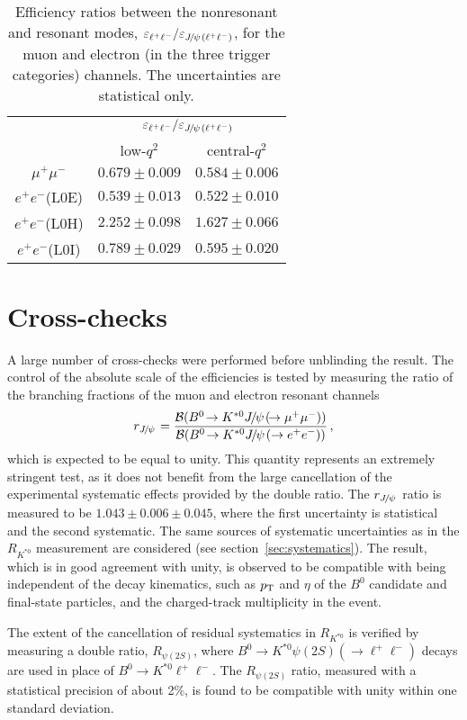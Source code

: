 \documentclass[12pt,a4paper]{article}
\def\mpmm       {\ensuremath{\Pmu^+ \Pmu^-}\xspace}
\def\RKst    {\mbox{R_{\Kstarz}}}
\def\Pmu         {\ensuremath{\upmu}\xspace}
\def\Ppsi        {\ensuremath{\uppsi}\xspace}
\def\PB      {\ensuremath{\mathrm{B}}\xspace}
\def\PJ      {\ensuremath{\mathrm{J}}\xspace}
\def\PK      {\ensuremath{\mathrm{K}}\xspace}
\def\Pe      {\ensuremath{\mathrm{e}}\xspace}
\def\Pmu         {\ensuremath{\mu}\xspace}
\def\Ppsi        {\ensuremath{\psi}\xspace}
\def\PB      {\ensuremath{B}\xspace}
\def\PJ      {\ensuremath{J}\xspace}
\def\PK      {\ensuremath{K}\xspace}
\def\Pe      {\ensuremath{e}\xspace}
\def\epem       {\ensuremath{\Pe^+\Pe^-}\xspace}
\def\ellm       {\ensuremath{\ell^-}\xspace}
\def\ellp       {\ensuremath{\ell^+}\xspace}
\def\kaon  {\ensuremath{\PK}\xspace}
\def\Kstarz  {\ensuremath{\kaon^{*0}}\xspace}
\def\B       {\ensuremath{\PB}\xspace}
\def\Bz      {\ensuremath{\B^0}\xspace}
\def\Bd      {\ensuremath{\B^0}\xspace}
\def\jpsi     {\ensuremath{{\PJ\mskip -3mu/\mskip -2mu\Ppsi\mskip 2mu}}\xspace}
\def\psitwos  {\ensuremath{\Ppsi{(2S)}}\xspace}
\def\BF         {{\ensuremath{\cal B}\xspace}}
\def\BR         {\BF}
\newcommand{\decay}[2]{\ensuremath{#1\!\to #2}\xspace}         \def\ra                 {\ensuremath{\rightarrow}\xspace}
\def\to                 {\ensuremath{\rightarrow}\xspace}
\def\qsq       {\ensuremath{q^2}\xspace}
\def\pt         {\mbox{$p_{\rm T}$}\xspace}
\def\lqsq{low-\qsq}
\def\cqsq{central-\qsq}
\def\loe{\textrm{L0E}\xspace}
\def\loh{\textrm{L0H}\xspace}
\def\loi{\textrm{L0I}\xspace}
\def\RJPs{\ensuremath{r_{\jpsi}}\xspace}
\def\RCC{\ensuremath{R_{\psitwos}}\xspace}
\def\RKst{\ensuremath{R_{\Kstarz}}\xspace}
\def\ll{\ensuremath{\ellp\ellm}\xspace}
\def\ellell{\ensuremath{\ellp\ellm}\xspace}
\def\JPsll{\ensuremath{\jpsi(\ellell)}\xspace}
\def\BdToKstll{\mbox{\decay{\Bd}{\Kstarz \ll}}\xspace}
\def\BdToKstJPsmm{\mbox{\decay{\Bd}{\Kstarz \jpsi(\decay{}{\mumu})}}\xspace}
\def\BdToKstJPsee{\mbox{\decay{\Bd}{\Kstarz \jpsi(\to\epem)}}\xspace}
\def\BdToKstPsill{\mbox{\decay{\Bd}{\Kstarz \psitwos(\to\ll)}}\xspace}
\begin{document}
\begin{table}[h!]
\centering
\caption{Efficiency ratios between the nonresonant and resonant modes, $\varepsilon_{\ellell} / \varepsilon_{\JPsll}$, for the muon and electron (in the three trigger categories) channels. The uncertainties are statistical only.}
\label{tab:efficiencyRatio}
\renewcommand\arraystretch{1.4}
\begin{tabular}{c|c|c}
			& \multicolumn{2}{c}{$\varepsilon_{\ellell} / \varepsilon_{\JPsll}$} \\
\cline{2-3}
			& \lqsq	& \cqsq \\ \hline
\mpmm		& $0.679 \pm 0.009$				& $0.584 \pm 0.006$ \\ \hline
\epem (\loe)	& $0.539 \pm 0.013$				& $0.522 \pm 0.010$ \\
\epem (\loh)	& $2.252 \pm 0.098$				& $1.627 \pm 0.066$ \\
\epem (\loi)	& $0.789 \pm 0.029$				& $0.595 \pm 0.020$ \\
\end{tabular}
\end{table}


\section{Cross-checks}
\label{sec:crosschecks}

A large number of cross-checks were performed before unblinding the result.
The control of the absolute scale of the efficiencies is tested by measuring the ratio of the branching fractions of the muon and electron resonant channels
\begin{eqnarray*}
\RJPs = \frac{\BR(\BdToKstJPsmm)} {\BR(\BdToKstJPsee)} \, ,
\end{eqnarray*}
which is expected to be equal to unity.
This quantity represents an extremely stringent test, as it does not benefit from the large cancellation of the experimental systematic effects provided by the double ratio.
The \RJPs ratio is measured to be $1.043 \pm 0.006 \pm 0.045$, where the first uncertainty is statistical and the second systematic.
The same sources of systematic uncertainties as in the \RKst measurement are considered (see section~\ref{sec:systematics}).
The result, which is in good agreement with unity, is observed to be compatible with being independent of the decay kinematics, such as \pt and $\eta$ of the \Bz candidate and final-state particles, and the charged-track multiplicity in the event.

The extent of the cancellation of residual systematics in \RKst is verified by measuring a double ratio, \RCC, where \BdToKstPsill decays are used in place of \BdToKstll.
The \RCC ratio, measured with a statistical precision of about 2\%, is found to be compatible with unity within one standard deviation.
\end{document}
